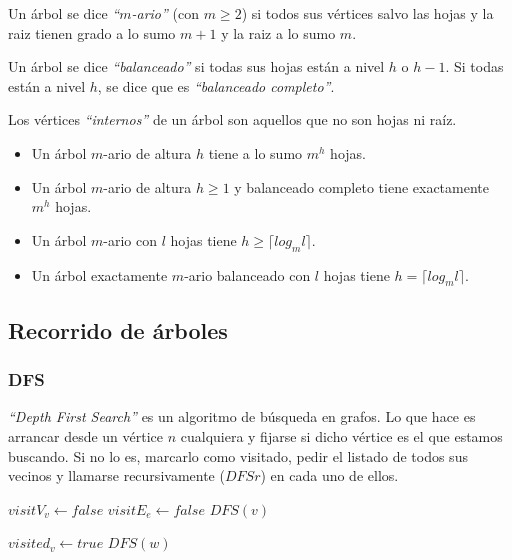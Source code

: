 Un \'arbol se dice \emph{``$m$-ario''} (con $m \geq 2$) si todos sus v\'ertices salvo las hojas y la raiz tienen grado a lo sumo $m+1$ y la raiz a lo sumo $m$.

Un \'arbol se dice \emph{``balanceado''} si todas sus hojas est\'an a nivel $h$ o $h-1$. Si todas est\'an a nivel $h$, se dice que es \emph{``balanceado completo''}.

Los v\'ertices \emph{``internos''} de un \'arbol son aquellos que no son hojas ni ra\'iz.

\begin{itemize}
\item Un \'arbol $m$-ario de altura $h$ tiene a lo sumo $m^h$ hojas. 
\item Un \'arbol $m$-ario de altura $h \geq 1$ y balanceado completo tiene exactamente $m^h$ hojas.
\item Un \'arbol $m$-ario con $l$ hojas tiene $h \geq \lceil log_{m}l \rceil$.
\item Un \'arbol exactamente $m$-ario balanceado con $l$ hojas tiene $h = \lceil log_{m}l \rceil$.
\end{itemize}

\subsection{Recorrido de \'arboles}
\subsubsection{DFS}

\emph{``Depth First Search''} es un algoritmo de b\'usqueda en grafos. Lo que hace es arrancar desde un v\'ertice $n$ cualquiera y fijarse si dicho v\'ertice es el que estamos buscando. Si no lo es, marcarlo como visitado, pedir el listado de todos sus vecinos y llamarse recursivamente ($DFSr$) en cada uno de ellos.
\vspace{8px}

\begin{algorithm}
\begin{algorithmic}[1]
    \State $visitV_v \gets false$
  \EndFor
    \State $visitE_e \gets false$
  \EndFor
      \State $DFS(v)$
    \EndIf
  \EndFor
\EndFunction
\end{algorithmic}
\end{algorithm}

\begin{algorithm}
\begin{algorithmic}[1]
  \State $visited_v \gets true$
      \State $DFS(w)$
    \EndIf
  \EndFor
\EndFunction
\end{algorithmic}
\end{algorithm}


